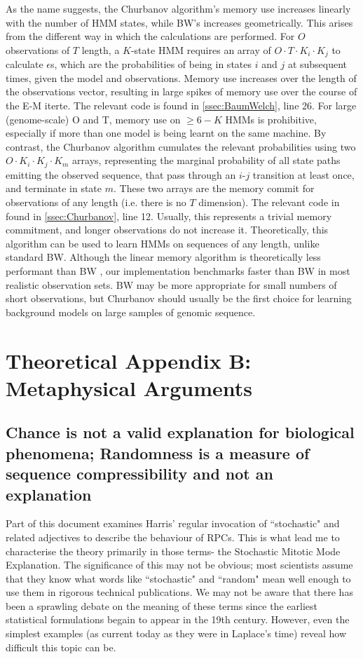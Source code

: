 \documentclass{ut-thesis}
\begin{document}
\begin{NoHyper}
As the name suggests, the Churbanov algorithm's memory use increases linearly with the number of HMM states, while BW's increases geometrically. This arises from the different way in which the calculations are performed. For $O$ observations of $T$ length, a $K$-state HMM requires an array of $O \cdot T \cdot K_i \cdot K_j$ to calculate $\epsilon$s, which are the probabilities of being in states $i$ and $j$ at subsequent times, given the model and observations. Memory use increases over the length of the observations vector, resulting in large spikes of memory use over the course of the E-M iterte. The relevant code is found in \autoref{ssec:BaumWelch}, line 26. For large (genome-scale) O and T, memory use on $\geq6-K$ HMMs is prohibitive, especially if more than one model is being learnt on the same machine. By contrast, the Churbanov algorithm cumulates the relevant probabilities using two $O \cdot K_i \cdot K_j \cdot K_m$ arrays, representing the marginal probability of all state paths emitting the observed sequence, that pass through an $i$-$j$ transition at least once, and terminate in state $m$. These two arrays are the memory commit for observations of any length (i.e. there is no $T$ dimension). The relevant code in found in \autoref{ssec:Churbanov}, line 12. Usually, this represents a trivial memory commitment, and longer observations do not increase it. Theoretically, this algorithm can be used to learn HMMs on sequences of any length, unlike standard BW. Although the linear memory algorithm is theoretically less performant than BW \cite{Churbanov2008}, our implementation benchmarks faster than BW in most realistic observation sets. BW may be more appropriate for small numbers of short observations, but Churbanov should usually be the first choice for learning background models on large samples of genomic sequence.
\chapter{Theoretical Appendix B: Metaphysical Arguments}
\section{Chance is not a valid explanation for biological phenomena; Randomness is a measure of sequence compressibility and not an explanation}
\label{sec:chance}
Part of this document examines Harris' regular invocation of ``stochastic" and related adjectives to describe the behaviour of RPCs. This is what lead me to characterise the theory primarily in those terms- the Stochastic Mitotic Mode Explanation. The significance of this may not be obvious; most scientists assume that they know what words like ``stochastic" and ``random" mean well enough to use them in rigorous technical publications. We may not be aware that there has been a sprawling debate on the meaning of these terms since the earliest statistical formulations begain to appear in the 19th century. However, even the simplest examples (as current today as they were in Laplace's time) reveal how difficult this topic can be.


\end{NoHyper}
\end{document}
